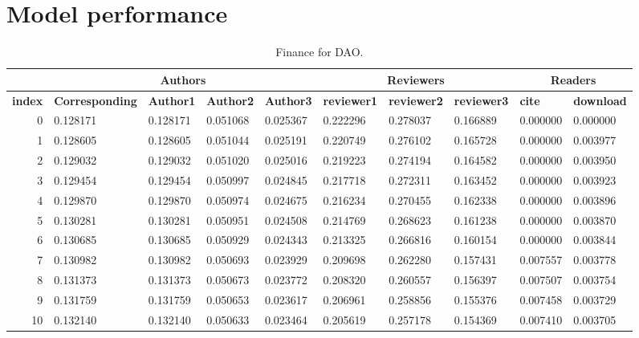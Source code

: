 \documentclass[lettersize,journal]{IEEEtran}
\begin{document}
\section{Model performance \label{sec:performance}}


\begin{table}[ht!]
  \begin{center}
    \caption{Finance for DAO.}
    \label{tab:finance}
    \begin{tabular}{r|l|l|l|l|l|l|l|l|l} %
      & \multicolumn{4}{c}{\textbf{Authors}} & \multicolumn{3}{|c|}{\textbf{Reviewers}} & \multicolumn{2}{c}{\textbf{Readers}}\\
      \hline
      \textbf{index} & \textbf{Corresponding} & \textbf{Author1} & \textbf{Author2} & \textbf{Author3} & \textbf{reviewer1} & \textbf{reviewer2} & \textbf{reviewer3} & \textbf{cite} & \textbf{download}\\
      \hline
      0 & 0.128171 & 0.128171 & 0.051068 & 0.025367 & 0.222296 & 0.278037 & 0.166889 & 0.000000 & 0.000000 \\
      1 & 0.128605 & 0.128605 & 0.051044 & 0.025191 & 0.220749 & 0.276102 & 0.165728 & 0.000000 & 0.003977 \\
      2 & 0.129032 & 0.129032 & 0.051020 & 0.025016 & 0.219223 & 0.274194 & 0.164582 & 0.000000 & 0.003950 \\
      3 & 0.129454 & 0.129454 & 0.050997 & 0.024845 & 0.217718 & 0.272311 & 0.163452 & 0.000000 & 0.003923 \\
      4 & 0.129870 & 0.129870 & 0.050974 & 0.024675 & 0.216234 & 0.270455 & 0.162338 & 0.000000 & 0.003896 \\
      5 & 0.130281 & 0.130281 & 0.050951 & 0.024508 & 0.214769 & 0.268623 & 0.161238 & 0.000000 & 0.003870 \\
      6 & 0.130685 & 0.130685 & 0.050929 & 0.024343 & 0.213325 & 0.266816 & 0.160154 & 0.000000 & 0.003844 \\
      7 & 0.130982 & 0.130982 & 0.050693 & 0.023929 & 0.209698 & 0.262280 & 0.157431 & 0.007557 & 0.003778 \\
      8 & 0.131373 & 0.131373 & 0.050673 & 0.023772 & 0.208320 & 0.260557 & 0.156397 & 0.007507 & 0.003754 \\
      9 & 0.131759 & 0.131759 & 0.050653 & 0.023617 & 0.206961 & 0.258856 & 0.155376 & 0.007458 & 0.003729 \\
      10 & 0.132140 & 0.132140 & 0.050633 & 0.023464 & 0.205619 & 0.257178 & 0.154369 & 0.007410 & 0.003705 \\

\end{tabular}
\end{center}
\end{table}
\end{document}
